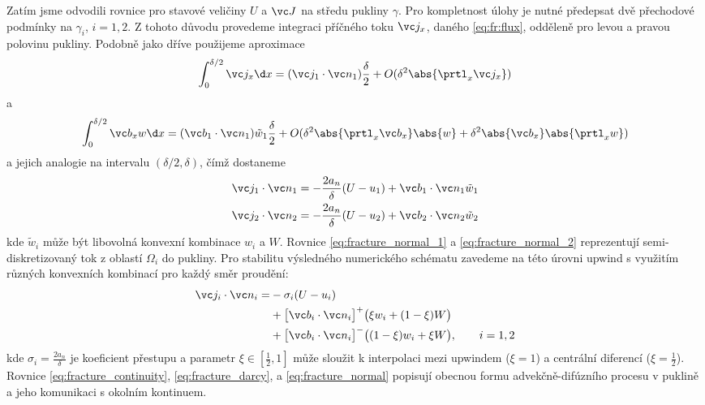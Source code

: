 Zatím jsme odvodili rovnice pro stavové veličiny $U$ a $\vc J$ na středu pukliny $\gamma$. Pro kompletnost úlohy je nutné předepsat dvě přechodové podmínky na $\gamma_i$, $i=1,2$. Z tohoto důvodu provedeme integraci příčného toku $\vc j_x$, daného \eqref{eq:fr:flux}, odděleně pro levou a pravou polovinu pukliny.
Podobně jako dříve použijeme aproximace
\[
 \int_0^{\delta/2} \vc j_x \d x = (\vc j_1 \cdot \vc n_1)\frac{\delta}{2} + O(\delta^2 \abs{\prtl_x \vc j_x})
\]
a
\[
 \int_0^{\delta/2} \vc b_x w \d x = (\vc b_1 \cdot \vc n_1)\tilde{w}_1\frac{\delta}{2} + O(\delta^2 \abs{\prtl_x \vc b_x}\abs{w} + \delta^2\abs{\vc b_x}\abs{\prtl_x w})
\]
a jejich analogie na intervalu $(\delta/2, \delta)$, čímž dostaneme
\begin{align}
    \label{eq:fracture_normal_1}
     \vc j_1 \cdot \vc n_1 &= -\frac{2a_n}{\delta} (U - u_1) + \vc b_1\cdot \vc n_1 \tilde{w}_1\\
    \label{eq:fracture_normal_2}
    \vc j_2 \cdot \vc n_2 &= -\frac{2a_n}{\delta} (U - u_2) + \vc b_2\cdot \vc n_2 \tilde{w}_2
\end{align}
kde $\tilde w_i$ může být libovolná konvexní kombinace $w_i$ a $W$. Rovnice \eqref{eq:fracture_normal_1}  
a \eqref{eq:fracture_normal_2} reprezentují semi-diskretizovaný tok z oblastí $\Omega_i$ do pukliny.
Pro stabilitu výsledného numerického schématu zavedeme na této úrovni upwind s využitím různých konvexních
kombinací pro každý směr proudění:
\begin{align}
   \notag 
   \vc j_i \cdot \vc n_i
       = &-\sigma_i (U - u_i)      \\ 
   \notag
      &+ \big[\vc b_i\cdot \vc n_i\big]^{+} \big(\xi w_i + (1-\xi) W\big)       \\
      \label{eq:fracture_normal}
      &+ \big[\vc b_i\cdot \vc n_i\big]^{-} \big((1-\xi) w_i + \xi W\big), \qquad i=1,2
\end{align}
kde $\sigma_i = \frac{2a_n}{\delta}$ je koeficient přestupu a parametr $\xi\in [\frac12, 1]$ může sloužit k interpolaci
mezi upwindem ($\xi = 1$) a centrální diferencí ($\xi=\frac12$). Rovnice \eqref{eq:fracture_continuity}, \eqref{eq:fracture_darcy}, a
\eqref{eq:fracture_normal} popisují obecnou formu advekčně-difúzního procesu v puklině a jeho komunikaci s 
okolním kontinuem.

